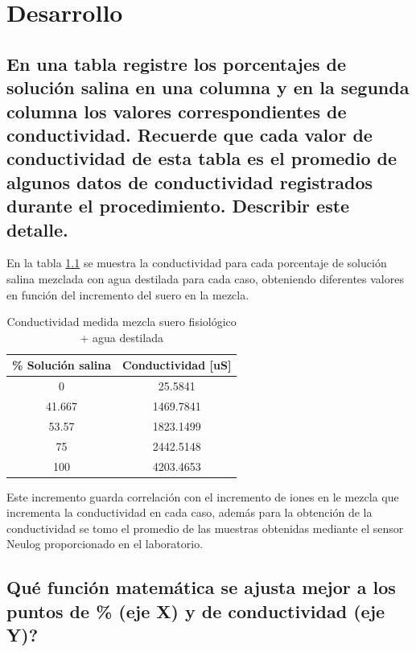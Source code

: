 \chapter{Desarrollo}


\section{En una tabla registre los porcentajes de solución salina en una columna y en la segunda columna los valores correspondientes de conductividad. Recuerde que cada valor de conductividad de esta tabla es el promedio de algunos datos de conductividad registrados durante el procedimiento. Describir este detalle.}

En la tabla \ref{tab:conductividad-mezclas} se muestra la conductividad para cada porcentaje de solución salina mezclada con agua destilada para cada caso, obteniendo diferentes valores en función del incremento del suero en la mezcla.

\begin{table}[h]
	\centering
	\begin{tabular}{|c|c|}
		\hline
		\textbf{\% Solución salina} & \textbf{Conductividad {[}uS{]}} \\ \hline
		0                           & 25.5841                         \\ \hline
		41.667                      & 1469.7841                       \\ \hline
		53.57                       & 1823.1499                       \\ \hline
		75                          & 2442.5148                       \\ \hline
		100                         & 4203.4653                       \\ \hline
	\end{tabular}
	\caption{Conductividad medida mezcla suero fisiológico + agua destilada}
	\label{tab:conductividad-mezclas}
\end{table}

Este incremento guarda correlación con el incremento de iones en le mezcla que incrementa la conductividad en cada caso, además para la obtención de la conductividad se tomo el promedio de las muestras obtenidas mediante el sensor Neulog proporcionado en el laboratorio.


\section{Qué función matemática se ajusta mejor a los puntos de \% (eje X) y de conductividad (eje Y)?}


